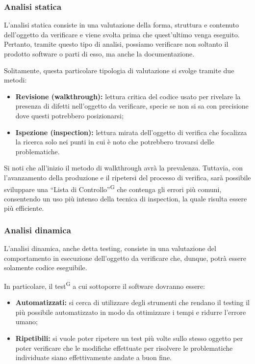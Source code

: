 \subsubsection{Analisi statica}
L'analisi statica consiste in una valutazione della forma, struttura e contenuto dell'oggetto da verificare e viene svolta prima che quest'ultimo venga eseguito. Pertanto, tramite questo tipo di analisi, possiamo verificare non soltanto il prodotto software o parti di esso, ma anche la documentazione.

Solitamente, questa particolare tipologia di valutazione si svolge tramite due metodi:
\begin{itemize}
    \item \textbf{Revisione (walkthrough):} lettura critica del codice usato per rivelare la presenza di difetti nell'oggetto da verificare, specie se non si sa con precisione dove questi potrebbero posizionarsi;
    \item \textbf{Ispezione (inspection):} lettura mirata dell’oggetto di verifica che focalizza la ricerca solo nei punti in cui è noto che potrebbero trovarsi delle problematiche.
\end{itemize}
Si noti che all'inizio il metodo di walkthrough avrà la prevalenza. Tuttavia, con l'avanzamento della produzione e il ripetersi del processo di verifica, sarà possibile sviluppare una ``Lista di Controllo''\textsuperscript{G} che contenga gli errori più comuni, consentendo un uso più intenso della tecnica di inspection, la quale risulta essere più efficiente.

\subsubsection{Analisi dinamica}
L'analisi dinamica, anche detta testing, consiste in una valutazione del comportamento in esecuzione dell'oggetto da verificare che, dunque, potrà essere solamente codice eseguibile.

In particolare, il test\textsuperscript{G} a cui sottoporre il software dovranno essere:
\begin{itemize}
    \item \textbf{Automatizzati:} si cerca di utilizzare degli strumenti che rendano il testing il più possibile automatizzato in modo da ottimizzare i tempi e ridurre l'errore umano;
    \item \textbf{Ripetibili:} si vuole poter ripetere un test più volte sullo stesso oggetto per poter verificare che le modifiche effettuate per risolvere le problematiche individuate siano effettivamente andate a buon fine.
\end{itemize}

